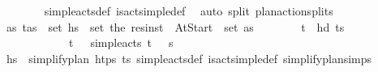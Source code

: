 \begin{isabellebody}
\ \ \ \ \ \ \isamarkupfalse%
\ simple{\isacharunderscore}{\kern0pt}acts{\isacharunderscore}{\kern0pt}def\ is{\isacharunderscore}{\kern0pt}act{\isacharunderscore}{\kern0pt}simple{\isacharunderscore}{\kern0pt}def\ \isamarkupfalse%
\ {\isacharparenleft}{\kern0pt}auto\ split{\isacharcolon}{\kern0pt}\ plan{\isacharunderscore}{\kern0pt}action{\isachardot}{\kern0pt}splits{\isacharparenright}{\kern0pt}\isanewline
\ \ \ \ \isamarkupfalse%
\ {\isachardoublequoteopen}{\isasymexists}as{\isachardot}{\kern0pt}\ {\isacharparenleft}{\kern0pt}t\isactrlsub {\isasympi}{\isacharcomma}{\kern0pt}as{\isacharparenright}{\kern0pt}\ {\isasymin}\ set\ hs{\isacharprime}{\kern0pt}\ {\isasymand}\ set\ {\isacharbrackleft}{\kern0pt}the\ {\isacharparenleft}{\kern0pt}res{\isacharunderscore}{\kern0pt}inst\ {\isasympi}\ At{\isacharunderscore}{\kern0pt}Start{\isacharparenright}{\kern0pt}{\isacharbrackright}{\kern0pt}\ {\isasymsubseteq}\ set\ as{\isachardoublequoteclose}\isanewline
\ \ \ \ \ \ \isamarkupfalse%
\ {\isacartoucheopen}{\isacharparenleft}{\kern0pt}t\isactrlsub {\isasympi}{\isacharcomma}{\kern0pt}{\isasympi}{\isacharparenright}{\kern0pt}\ {\isacharequal}{\kern0pt}\ hd\ {\isacharparenleft}{\kern0pt}{\isacharparenleft}{\kern0pt}t\isactrlsub {\isasympi}{\isacharcomma}{\kern0pt}{\isasympi}{\isacharparenright}{\kern0pt}{\isacharhash}{\kern0pt}{\isasympi}s\ \isanewline
\ \ \ \ \ \ \ \ \ \ \ \ {\isacartoucheopen}{\isacharparenleft}{\kern0pt}t\isactrlsub {\isasympi}{\isacharcomma}{\kern0pt}\ {\isasympi}{\isacharparenright}{\kern0pt}\ {\isasymin}\ simple{\isacharunderscore}{\kern0pt}acts\ {\isacharparenleft}{\kern0pt}{\isacharparenleft}{\kern0pt}t\isactrlsub {\isasympi}{\isacharcomma}{\kern0pt}\ {\isasympi}{\isacharparenright}{\kern0pt}\ {\isacharhash}{\kern0pt}\ {\isasympi}s\isanewline
\ \ \ \ \ \ \isamarkupfalse%
\ {\isacartoucheopen}hs{\isacharprime}{\kern0pt}\ {\isacharequal}{\kern0pt}\ simplify{\isacharunderscore}{\kern0pt}plan\ htps\ {\isacharparenleft}{\kern0pt}{\isacharparenleft}{\kern0pt}t\isactrlsub {\isasympi}{\isacharcomma}{\kern0pt}{\isasympi}{\isacharparenright}{\kern0pt}{\isacharhash}{\kern0pt}{\isasympi}s\ simple{\isacharunderscore}{\kern0pt}acts{\isacharunderscore}{\kern0pt}def\ is{\isacharunderscore}{\kern0pt}act{\isacharunderscore}{\kern0pt}simple{\isacharunderscore}{\kern0pt}def\ simplify{\isacharunderscore}{\kern0pt}plan{\isachardot}{\kern0pt}simps\isanewline

\end{isabellebody}
